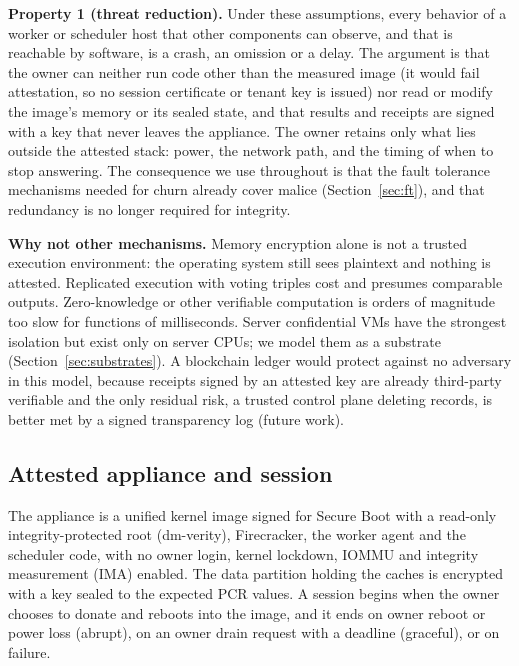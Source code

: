 \textbf{Property 1 (threat reduction).} Under these assumptions, every behavior of a worker or scheduler host that other
components can observe, and that is reachable by software, is a crash, an omission or a delay. The argument is that the owner can neither run code other than the measured
image (it would fail attestation, so no session certificate or tenant key is issued) nor read or modify the image's memory or its sealed
state, and that results and receipts are signed with a key that never leaves the appliance. The owner retains only what lies outside the attested
stack: power, the network path, and the timing of when to stop answering. The consequence we use throughout is that the fault tolerance
mechanisms needed for churn already cover malice (Section~\ref{sec:ft}), and that redundancy is no longer required for
integrity.

\textbf{Why not other mechanisms.} Memory encryption alone is not a trusted execution environment: the operating system still sees
plaintext and nothing is attested. Replicated execution with voting triples cost and presumes comparable outputs. Zero-knowledge
or other verifiable computation is orders of magnitude too slow for functions of milliseconds. Server confidential VMs have the strongest
isolation but exist only on server CPUs; we model them as a substrate (Section~\ref{sec:substrates}). A blockchain ledger would protect against no
adversary in this model, because receipts signed by an attested key are already third-party verifiable and the only residual risk, a
trusted control plane deleting records, is better met by a signed transparency log (future work).

\subsection{Attested appliance and session}
The appliance is a unified kernel image signed for Secure Boot with a read-only integrity-protected root (dm-verity), Firecracker, the
worker agent and the scheduler code, with no owner login, kernel lockdown, IOMMU and integrity measurement (IMA) enabled. The data
partition holding the caches is encrypted with a key sealed to the expected PCR values. A session begins when the owner chooses to
donate and reboots into the image, and it ends on owner reboot or power loss (abrupt), on an owner drain request with a deadline
(graceful), or on failure.

